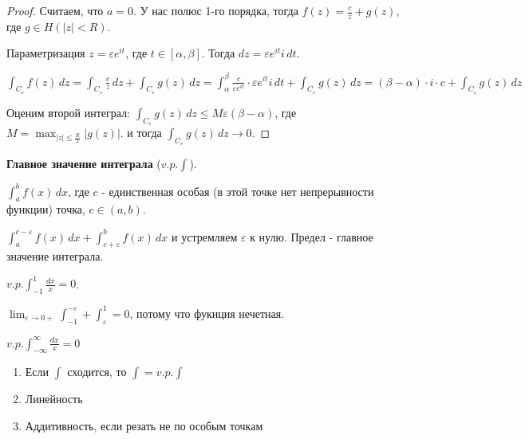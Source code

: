 \begin{proof}
    Считаем, что $a = 0$. У нас полюс 1-го порядка, тогда $f(z) = \frac{c}{z} + g(z)$, где $g \in H(|z| < R)$.

    Параметризация $z = \varepsilon e^{it}$, где $t \in [\alpha, \beta]$. Тогда $dz = \varepsilon e^{it} i \, dt$.

    $\int_{C_{\varepsilon}} f(z) \, dz = \int_{C_{\varepsilon}} \frac{c}{z} \, dz + \int_{C_{\varepsilon}} g(z) \, dz =
    \int_{\alpha}^{\beta} \frac{c}{\varepsilon e^{it}} \cdot \varepsilon e^{it} i \, dt + \int_{C_{\varepsilon}} g(z) \, dz = (\beta - \alpha) \cdot i \cdot c + \int_{C_{\varepsilon}} g(z) \, dz$

    Оценим второй интеграл: $\int_{C_{\varepsilon}} g(z) \, dz \leqslant M \varepsilon (\beta - \alpha)$, где $M = \max_{|z| \leqslant \frac{R}{2}} |g(z)|$. и
    тогда $\int_{C_{\varepsilon}} g(z) \, dz \rightarrow 0$.
\end{proof}

\begin{definition}
    \textbf{Главное значение интеграла} ($v.p. \int$).

    $\int_{a}^{b} f(x) \, dx$, где $c$ - единственная особая (в этой точке нет непрерывности функции) точка, $c \in (a, b)$.

    $\int_{a}^{c - \varepsilon} f(x) \, dx + \int_{c + \varepsilon}^{b} f(x) \, dx$
    и устремляем $\varepsilon$ к нулю. Предел - главное значение интеграла.
\end{definition}

\begin{example}
    $v.p. \int_{-1}^{1} \frac{dx}{x} = 0$.

    $\lim_{\varepsilon \rightarrow 0+} \int_{-1}^{-\varepsilon} + \int_{\varepsilon}^{1} = 0$, потому что
    фукнция нечетная.

    $v.p. \int_{-\infty}^{\infty} \frac{dx}{x} = 0$
\end{example}

\begin{properties}
    \begin{enumerate}
        \item {
            Если $\int$ сходится, то $\int = v.p. \int$
        }
        \item {
            Линейность
        }
        \item {
            Аддитивность, если резать не по особым точкам
        }
    \end{enumerate}
\end{properties}

